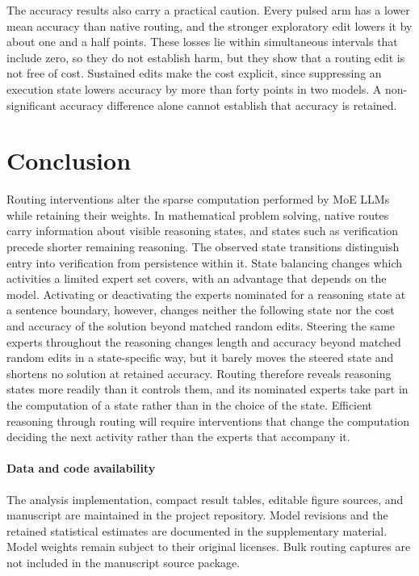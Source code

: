 The accuracy results also carry a practical caution.
%
Every pulsed arm has a lower mean accuracy than native routing, and the stronger exploratory edit lowers it by about one and a half points.
%
These losses lie within simultaneous intervals that include zero, so they do not establish harm, but they show that a routing edit is not free of cost.
%
Sustained edits make the cost explicit, since suppressing an execution state lowers accuracy by more than forty points in two models.
%
A non-significant accuracy difference alone cannot establish that accuracy is retained.
%

\section{Conclusion}
\label{sec:conclusion}

Routing interventions alter the sparse computation performed by MoE LLMs while retaining their weights.
%
In mathematical problem solving, native routes carry information about visible reasoning states, and states such as verification precede shorter remaining reasoning.
%
The observed state transitions distinguish entry into verification from persistence within it.
%
State balancing changes which activities a limited expert set covers, with an advantage that depends on the model.
%
Activating or deactivating the experts nominated for a reasoning state at a sentence boundary, however, changes neither the following state nor the cost and accuracy of the solution beyond matched random edits.
%
Steering the same experts throughout the reasoning changes length and accuracy beyond matched random edits in a state-specific way, but it barely moves the steered state and shortens no solution at retained accuracy.
%
Routing therefore reveals reasoning states more readily than it controls them, and its nominated experts take part in the computation of a state rather than in the choice of the state.
%
Efficient reasoning through routing will require interventions that change the computation deciding the next activity rather than the experts that accompany it.
%

\paragraph{Data and code availability}
The analysis implementation, compact result tables, editable figure sources, and manuscript are maintained in the project repository.
%
Model revisions and the retained statistical estimates are documented in the supplementary material.
%
Model weights remain subject to their original licenses.
%
Bulk routing captures are not included in the manuscript source package.
%
